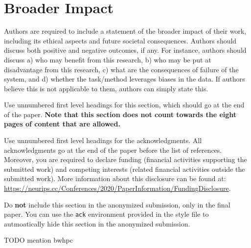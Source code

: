 \section*{Broader Impact}

Authors are required to include a statement of the broader impact of their work, including its ethical aspects and future societal consequences.
Authors should discuss both positive and negative outcomes, if any. For instance, authors should discuss a)
who may benefit from this research, b) who may be put at disadvantage from this research, c) what are the consequences of failure of the system, and d) whether the task/method leverages
biases in the data. If authors believe this is not applicable to them, authors can simply state this.

Use unnumbered first level headings for this section, which should go at the end of the paper. {\bf Note that this section does not count towards the eight pages of content that are allowed.}

\begin{ack}
    Use unnumbered first level headings for the acknowledgments. All acknowledgments
    go at the end of the paper before the list of references. Moreover, you are required to declare
    funding (financial activities supporting the submitted work) and competing interests (related financial activities outside the submitted work).
    More information about this disclosure can be found at: \url{https://neurips.cc/Conferences/2020/PaperInformation/FundingDisclosure}.


    Do {\bf not} include this section in the anonymized submission, only in the final paper. You can use the \texttt{ack} environment provided in the style file to autmoatically hide this section in the anonymized submission.

    TODO mention bwhpc
\end{ack}